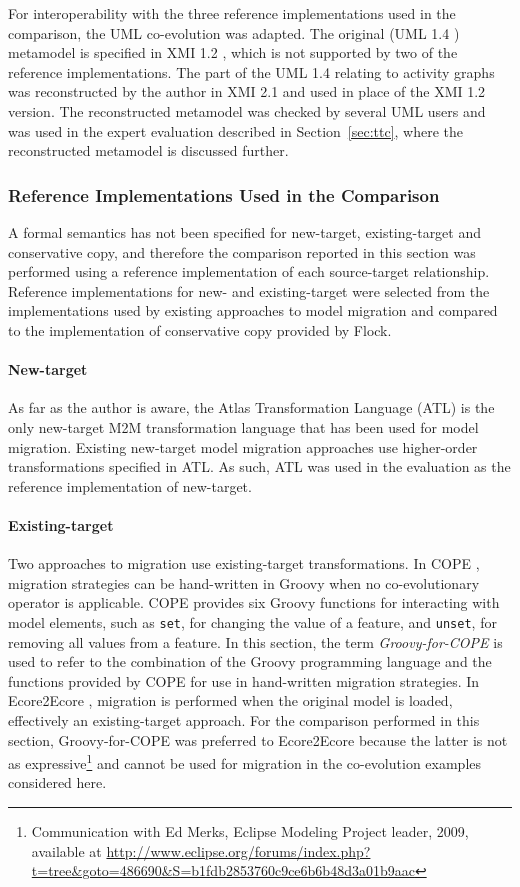 For interoperability with the three reference implementations used in the comparison, the UML co-evolution was adapted. The original (UML 1.4 \cite{uml14}) metamodel is specified in XMI 1.2 \cite{xmi}, which is not supported by two of the reference implementations. The part of the UML 1.4 relating to activity graphs was reconstructed by the author in XMI 2.1 and used in place of the XMI 1.2 version. The reconstructed metamodel was checked by several UML users and was used in the expert evaluation described in Section~\ref{sec:ttc}, where the reconstructed metamodel is discussed further. 

\subsubsection{Reference Implementations Used in the Comparison}
A formal semantics has not been specified for new-target, existing-target and conservative copy, and therefore the comparison reported in this section was performed using a reference implementation of each source-target relationship. Reference implementations for new- and existing-target were selected from the implementations used by existing approaches to model migration and compared to the implementation of conservative copy provided by Flock.

\paragraph{New-target} As far as the author is aware, the Atlas Transformation Language (ATL) is the only new-target M2M transformation language that has been used for model migration. Existing new-target model migration approaches \cite{cicchetti08automating,garces09managing} use higher-order transformations specified in ATL. As such, ATL was used in the evaluation as the reference implementation of new-target.

\paragraph{Existing-target} Two approaches to migration use existing-target transformations. In COPE \cite{herrmannsdoerfer09cope}, migration strategies can be hand-written in Groovy when no co-evolutionary operator is applicable. COPE provides six Groovy functions for interacting with model elements, such as \texttt{set}, for changing the value of a feature, and \texttt{unset}, for removing all values from a feature. In this section, the term \emph{Groovy-for-COPE} is used to refer to the combination of the Groovy programming language and the functions provided by COPE for use in hand-written migration strategies. In Ecore2Ecore \cite{hussey06advanced}, migration is performed when the original model is loaded, effectively an existing-target approach. For the comparison performed in this section, Groovy-for-COPE was preferred to Ecore2Ecore because the latter is not as expressive\footnote{Communication with Ed Merks, Eclipse Modeling Project leader, 2009, available at \url{http://www.eclipse.org/forums/index.php?t=tree&goto=486690&S=b1fdb2853760c9ce6b6b48d3a01b9aac}} and cannot be used for migration in the co-evolution examples considered here.

